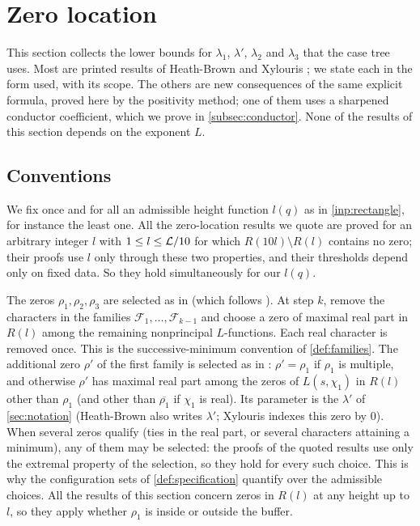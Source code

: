 \section{Zero location}\label{sec:location}

This section collects the lower bounds for $\lambda_1$, $\lambda'$, $\lambda_2$ and $\lambda_3$ that the
case tree uses. Most are printed results of Heath-Brown \cite{HeathBrown1992zero} and Xylouris
\cite{Xylouris2011nullstellen}; we state each in the form used, with its scope. The others are new
consequences of the same explicit formula, proved here by the positivity method; one of them uses
a sharpened conductor coefficient, which we prove in \cref{subsec:conductor}. None of the results of
this section depends on the exponent $L$.

\subsection{Conventions}\label{subsec:locconventions}
We fix once and for all an admissible height function $l(q)$ as in \cref{inp:rectangle}, for
instance the least one. All the zero-location results we quote are proved for an arbitrary
integer $l$ with $1\le l\le\mathcal{L}/10$ for which $R(10l)\setminus R(l)$ contains no zero; their proofs use
$l$ only through these two properties, and their thresholds depend only on fixed data. So they
hold simultaneously for our $l(q)$.

The zeros $\rho_1,\rho_2,\rho_3$ are selected as in \cite[(3.11)--(3.12), p.~21]{Xylouris2011nullstellen}
(which follows \cite[\S6]{HeathBrown1992zero}). At step $k$, remove the characters in the
families $\mathcal F_1,\ldots,\mathcal F_{k-1}$ and choose a zero of maximal real part
in $R(l)$ among the remaining nonprincipal $L$-functions. Each real character is
removed once. This is the successive-minimum convention of \cref{def:families}.
The additional zero
$\rho'$ of the first family is selected as in \cite[pp.~21--22]{Xylouris2011nullstellen}: $\rho'=\rho_1$ if
$\rho_1$ is multiple, and otherwise $\rho'$ has maximal real part among the zeros of $L(s,\chi_1)$ in
$R(l)$ other than $\rho_1$ (and other than $\overline{\rho_1}$ if $\chi_1$ is real). Its parameter is the
$\lambda'$ of \cref{sec:notation} (Heath-Brown also writes $\lambda'$; Xylouris indexes this zero by $0$). When several zeros qualify
(ties in the real part, or several characters attaining a minimum), any of them may be selected:
the proofs of the quoted results use only the extremal property of the selection, so they hold for
every such choice. This is why the configuration sets of \cref{def:specification} quantify over the
admissible choices. All the results of this section concern zeros in $R(l)$ at any height up to
$l$, so they apply whether $\rho_1$ is inside or outside the buffer.


